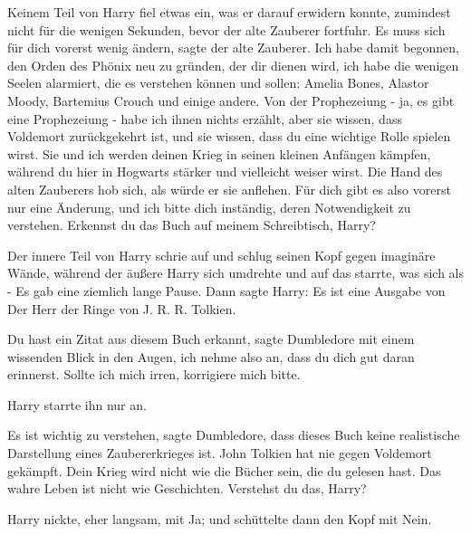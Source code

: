 Keinem Teil von Harry fiel etwas ein, was er darauf erwidern konnte, zumindest
nicht für die wenigen Sekunden, bevor der alte Zauberer fortfuhr. \glqq Es muss
sich für dich vorerst wenig ändern\grqq{}, sagte der alte Zauberer. \glqq Ich
habe damit begonnen, den Orden des Phönix neu zu gründen, der dir dienen wird,
ich habe die wenigen Seelen alarmiert, die es verstehen können und sollen:
Amelia Bones, Alastor Moody, Bartemius Crouch und einige andere. Von der
Prophezeiung - ja, es gibt eine Prophezeiung - habe ich ihnen nichts erzählt,
aber sie wissen, dass Voldemort zurückgekehrt ist, und sie wissen, dass du eine
wichtige Rolle spielen wirst. Sie und ich werden deinen Krieg in seinen kleinen
Anfängen kämpfen, während du hier in Hogwarts stärker und vielleicht weiser
wirst.\grqq{} Die Hand des alten Zauberers hob sich, als würde er sie anflehen.
\glqq Für dich gibt es also vorerst nur eine Änderung, und ich bitte dich
inständig, deren Notwendigkeit zu verstehen. Erkennst du das Buch auf meinem
Schreibtisch, Harry?\grqq{}

Der innere Teil von Harry schrie auf und schlug seinen Kopf gegen imaginäre
Wände, während der äußere Harry sich umdrehte und auf das starrte, was sich als
- Es gab eine ziemlich lange Pause. Dann sagte Harry: \glqq Es ist eine Ausgabe
von Der Herr der Ringe von J. R. R. Tolkien.\grqq{}

\glqq Du hast ein Zitat aus diesem Buch erkannt\grqq{}, sagte Dumbledore mit
einem wissenden Blick in den Augen, \glqq ich nehme also an, dass du dich gut
daran erinnerst. Sollte ich mich irren, korrigiere mich bitte.\grqq{}

Harry starrte ihn nur an.

\glqq Es ist wichtig zu verstehen\grqq{}, sagte Dumbledore, \glqq dass dieses
Buch keine realistische Darstellung eines Zaubererkrieges ist. John Tolkien hat
nie gegen Voldemort gekämpft. Dein Krieg wird nicht wie die Bücher sein, die du
gelesen hast. Das wahre Leben ist nicht wie Geschichten. Verstehst du das,
Harry?\grqq{}

Harry nickte, eher langsam, mit Ja; und schüttelte dann den Kopf mit Nein.

